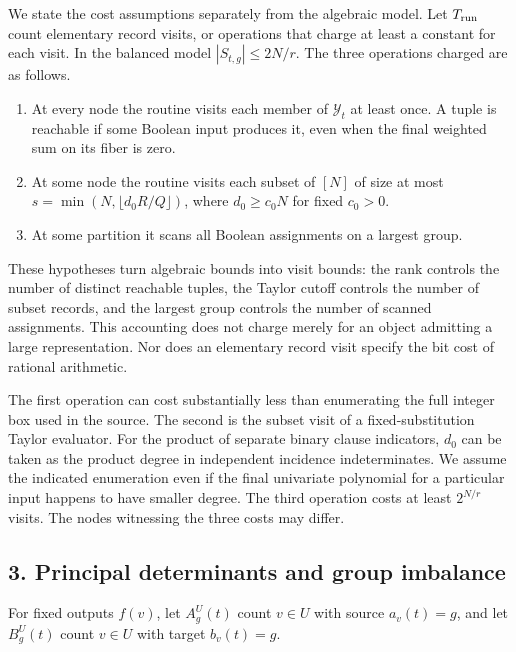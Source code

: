 \documentclass[
  10pt,
]{article}
\providecommand{\tightlist}{%
  \setlength{\itemsep}{0pt}\setlength{\parskip}{0pt}}
\begin{document}
We state the cost assumptions separately from the algebraic model. Let
\(T_{\rm run}\) count elementary record visits, or operations that
charge at least a constant for each visit. In the balanced model
\(|S_{t,g}|\le2N/r\). The three operations charged are as follows.

\begin{enumerate}
\def\labelenumi{\arabic{enumi}.}
\tightlist
\item
  At every node the routine visits each member of \(\mathcal Y_t\) at
  least once. A tuple is reachable if some Boolean input produces it,
  even when the final weighted sum on its fiber is zero.
\item
  At some node the routine visits each subset of \([N]\) of size at most
  \(s=\min(N,\lfloor d_0R/Q\rfloor)\), where \(d_0\ge c_0N\) for fixed
  \(c_0>0\).
\item
  At some partition it scans all Boolean assignments on a largest group.
\end{enumerate}

These hypotheses turn algebraic bounds into visit bounds: the rank
controls the number of distinct reachable tuples, the Taylor cutoff
controls the number of subset records, and the largest group controls
the number of scanned assignments. This accounting does not charge
merely for an object admitting a large representation. Nor does an
elementary record visit specify the bit cost of rational arithmetic.

The first operation can cost substantially less than enumerating the
full integer box used in the source. The second is the subset visit of a
fixed-substitution Taylor evaluator. For the product of separate binary
clause indicators, \(d_0\) can be taken as the product degree in
independent incidence indeterminates. We assume the indicated
enumeration even if the final univariate polynomial for a particular
input happens to have smaller degree. The third operation costs at least
\(2^{N/r}\) visits. The nodes witnessing the three costs may differ.

\subsection{3. Principal determinants and group
imbalance}\label{principal-determinants-and-group-imbalance}

For fixed outputs \(f(v)\), let \(A_g^U(t)\) count \(v\in U\) with
source \(a_v(t)=g\), and let \(B_g^U(t)\) count \(v\in U\) with target
\(b_v(t)=g\).
\end{document}
